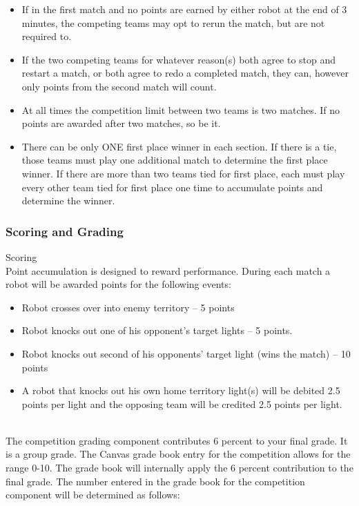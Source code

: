 \documentclass{article}
\begin{document}
\begin{itemize}
    \item If in the first match and no points are earned by either robot at the end of 3 minutes, the competing teams may opt to rerun the match, but are not required to. 
    \item If the two competing teams for whatever reason(s) both agree to stop and restart a match, or both agree to redo a completed match, they can, however only points from the second match will count.
    \item At all times the competition limit between two teams is two matches.  If no points are awarded after two matches, so be it.
    \item There can be only ONE first place winner in each section. If there is a tie, those teams must play one additional match to determine the first place winner.  If there are more than two teams tied for first place, each must play every other team tied for first place one time to accumulate points and determine the winner.    
\end{itemize}

\subsubsection{Scoring and Grading}
Scoring \\
Point accumulation is designed to reward performance.  During each match a robot will be awarded points for the following events:
\begin{itemize}
    \item Robot crosses over into enemy territory –  5 points
    \item Robot knocks out one of his opponent’s target lights – 5 points.
    \item Robot knocks out second of his opponents’ target light (wins the match) – 10 points
    \item A robot that knocks out his own home territory light(s) will be debited 2.5 points per light and the opposing team will be credited 2.5 points per light.
\end{itemize}\\

The competition grading component contributes 6 percent to your final grade.  It is a group grade.  The Canvas grade book entry for the competition allows for the range 0-10.  The grade book will internally apply the 6 percent contribution to the final grade.   The number entered in the grade book for the competition component will be determined as follows:
\end{document}
